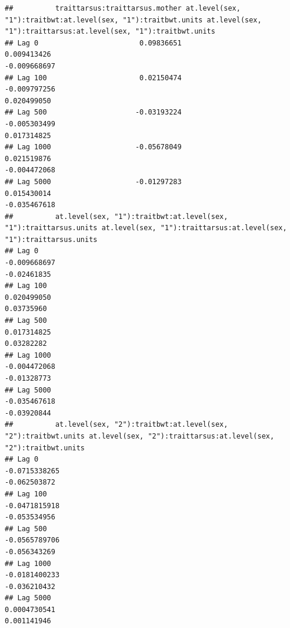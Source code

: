 \documentclass[
  12pt,
]{book}
\begin{document}
\begin{verbatim}
##          traittarsus:traittarsus.mother at.level(sex, "1"):traitbwt:at.level(sex, "1"):traitbwt.units at.level(sex, "1"):traittarsus:at.level(sex, "1"):traitbwt.units
## Lag 0                        0.09836651                                                   0.009413426                                                     -0.009668697
## Lag 100                      0.02150474                                                  -0.009797256                                                      0.020499050
## Lag 500                     -0.03193224                                                  -0.005303499                                                      0.017314825
## Lag 1000                    -0.05678049                                                   0.021519876                                                     -0.004472068
## Lag 5000                    -0.01297283                                                   0.015430014                                                     -0.035467618
##          at.level(sex, "1"):traitbwt:at.level(sex, "1"):traittarsus.units at.level(sex, "1"):traittarsus:at.level(sex, "1"):traittarsus.units
## Lag 0                                                        -0.009668697                                                         -0.02461835
## Lag 100                                                       0.020499050                                                          0.03735960
## Lag 500                                                       0.017314825                                                          0.03282282
## Lag 1000                                                     -0.004472068                                                         -0.01328773
## Lag 5000                                                     -0.035467618                                                         -0.03920844
##          at.level(sex, "2"):traitbwt:at.level(sex, "2"):traitbwt.units at.level(sex, "2"):traittarsus:at.level(sex, "2"):traitbwt.units
## Lag 0                                                    -0.0715338265                                                     -0.062503872
## Lag 100                                                  -0.0471815918                                                     -0.053534956
## Lag 500                                                  -0.0565789706                                                     -0.056343269
## Lag 1000                                                 -0.0181400233                                                     -0.036210432
## Lag 5000                                                  0.0004730541                                                      0.001141946

\end{verbatim}
\end{document}
